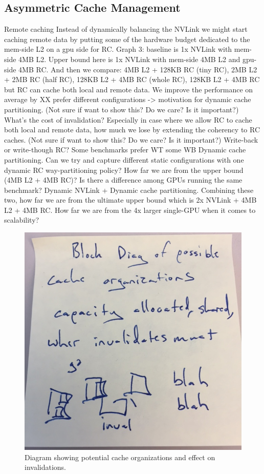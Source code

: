 \subsection{Asymmetric Cache Management}
\label{caching}
Remote caching
Instead of dynamically balancing the NVLink we might start caching remote data 
by putting some of the hardware budget dedicated to the mem-side L2 on a gpu 
side for RC. 
Graph 3: baseline is 1x NVLink with mem-side 4MB L2. Upper bound here is 1x 
NVLink with mem-side 4MB L2 and gpu-side 4MB RC. And then we compare: 4MB L2 + 
128KB RC (tiny RC), 2MB L2 + 2MB RC (half RC), 128KB L2 + 4MB RC (whole RC), 
128KB L2 + 4MB RC but RC can cache both local and remote data. We improve the 
performance on average by XX%
prefer different configurations -> motivation for dynamic cache partitioning. 
(Not sure if want to show this? Do we care? Is it important?) What’s the cost of 
invalidation? Especially in case where we allow RC to cache both local and 
remote data, how much we lose by extending the coherency to RC caches. 
(Not sure if want to show this? Do we care? Is it important?) Write-back or 
write-though RC? Some benchmarks prefer WT some WB
Dynamic cache partitioning. Can we try and capture different static 
configurations with one dynamic RC way-partitioning policy? How far we are from 
the upper bound (4MB L2 + 4MB RC)? Is there a difference among GPUs running the 
same benchmark? 
Dynamic NVLink + Dynamic cache partitioning. Combining these two, how far we are 
from the ultimate upper bound which is 2x NVLink + 4MB L2 + 4MB RC. How far we 
are from the 4x larger single-GPU when it comes to scalability?

\begin{figure}[tp]
    \centering
    \includegraphics[width=1.0\columnwidth]{figures/cacheorg.jpg}
    \caption{Diagram showing potential cache organizations and effect on 
invalidations.}
    \label{fig:cacheorg}
\end{figure}



